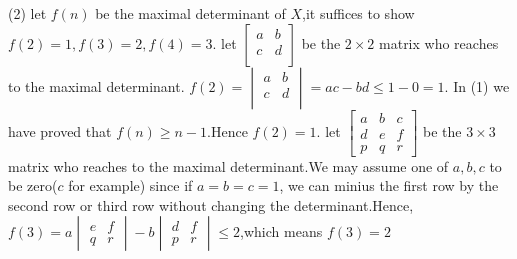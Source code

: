\documentclass[a4paper,12pt]{article}
\newenvironment{prooff}{{\noindent\it\textcolor{cyan!40!black}{Proof}:}\quad}{\par}
\newcommand{\bbrace}[1]{\left\{ #1 \right\} }
\newtheorem{lem}[defn]{Lemma}
\begin{document}
\begin{prooff}
    (2)
    let $f(n)$ be the maximal determinant of $X$,it suffices to show $f(2)=1,f(3)=2,f(4)=3$.
    let $\begin{bmatrix}
            a & b \\
            c & d \\
        \end{bmatrix}$ be the $2\times 2$ matrix who reaches to the maximal determinant.
    $f(2)=\begin{vmatrix}
            a & b \\
            c & d \\
        \end{vmatrix}=ac-bd\le 1-0=1$. In (1) we have proved that $f(n)\ge n-1$.Hence $f(2)=1$.
    let $\begin{bmatrix}
            a & b & c \\
            d & e & f \\
            p & q & r
        \end{bmatrix}$ be the $3\times 3$ matrix who reaches to the maximal determinant.We may assume one of $a,b,c$ to be zero($c$ for example) since
    if $a=b=c=1$, we can minius the first row by the second row or third row without changing the determinant.Hence,
    $f(3)=a\begin{vmatrix}
            e & f \\
            q & r
        \end{vmatrix}-b\begin{vmatrix}
            d & f \\
            p & r
        \end{vmatrix}\le 2$,which means $f(3)=2$


\end{prooff}
\end{document}
